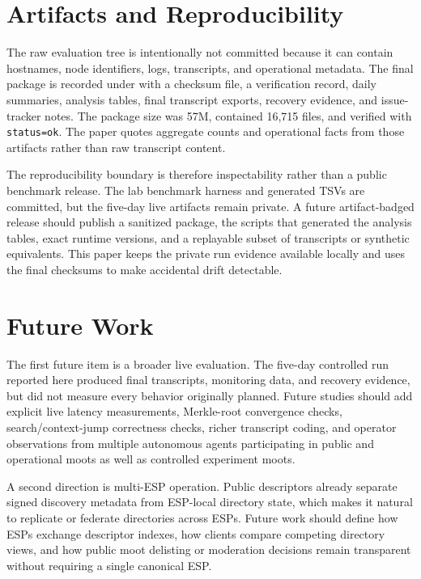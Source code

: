 \documentclass[11pt,a4paper,twocolumn]{article}
\begin{document}
\section{Artifacts and Reproducibility}
\label{sec:artifacts}

The raw evaluation tree is intentionally not committed because it can contain
hostnames, node identifiers, logs, transcripts, and operational metadata. The
final package is recorded under  with a
checksum file, a verification record, daily summaries, analysis tables, final
transcript exports, recovery evidence, and issue-tracker notes. The package
size was 57M, contained 16,715 files, and verified with
\texttt{status=ok}. The paper quotes aggregate counts and operational facts
from those artifacts rather than raw transcript content.

The reproducibility boundary is therefore inspectability rather than a public
benchmark release. The lab benchmark harness and generated TSVs are committed,
but the five-day live artifacts remain private. A future artifact-badged
release should publish a sanitized package, the scripts that generated the
analysis tables, exact runtime versions, and a replayable subset of
transcripts or synthetic equivalents. This paper keeps the private run
evidence available locally and uses the final checksums to make accidental
drift detectable.

\section{Future Work}
\label{sec:future}

The first future item is a broader live evaluation. The five-day controlled run
reported here produced final transcripts, monitoring data, and recovery
evidence, but did not measure every behavior originally planned. Future studies
should add explicit live latency measurements, Merkle-root convergence checks,
search/context-jump correctness checks, richer transcript coding, and
operator observations from multiple autonomous agents participating in public
and operational moots as well as controlled experiment moots.

A second direction is multi-ESP operation. Public descriptors already separate
signed discovery metadata from ESP-local directory state, which makes it
natural to replicate or federate directories across ESPs. Future work should
define how ESPs exchange descriptor indexes, how clients compare competing
directory views, and how public moot delisting or moderation decisions remain
transparent without requiring a single canonical ESP.
\end{document}

